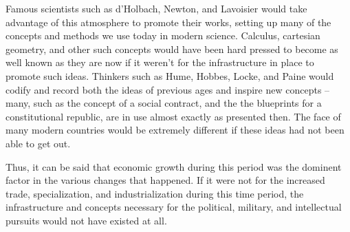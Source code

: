 \documentclass{article}
\begin{document}
Famous scientists such as d'Holbach, Newton, and Lavoisier would take advantage of this atmosphere to promote their works, setting up many of the concepts and methods we use today in modern science. 
Calculus, cartesian geometry, and other such concepts would have been hard pressed to become as well known as they are now if it weren't for the infrastructure in place to promote such ideas.
Thinkers such as Hume, Hobbes, Locke, and Paine would codify and record both the ideas of previous ages and inspire new concepts -- many, such as the concept of a social contract, and the the blueprints for a constitutional republic, are in use almost exactly as presented then.
The face of many modern countries would be extremely different if these ideas had not been able to get out.

Thus, it can be said that economic growth during this period was the dominent factor in the various changes that happened. If it were not for the increased trade, specialization, and industrialization during this time period, the infrastructure and concepts necessary for the political, military, and intellectual pursuits would not have existed at all.
\end{document}
